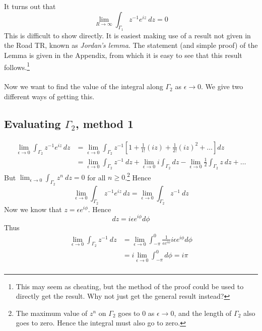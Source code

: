 It turns out that 
$$\lim_{R\to \infty}\int_{\Gamma_1} z^{-1}e^{iz}\ dz =0$$
This is difficult to show directly. It is easiest making use of a result not given in the Road TR, known as \emph{Jordan's lemma}. The statement (and simple proof) of the Lemma is given in the Appendix, from which it is easy to see that this result follows.\footnote{This may seem as cheating, but the method of the proof could be used to directly get the result. Why not just get the general result instead?} \\ \\
Now we want to find the value of the integral along $\Gamma_2$ as $\epsilon\to 0$. We give two different ways of getting this.
\subsection*{Evaluating $\Gamma_2$, method 1}
\begin{align*}
\lim_{\epsilon \to 0} \int_{\Gamma_2} z^{-1}e^{iz}\, dz&=\lim_{\epsilon \to 0} \int_{\Gamma_2} z^{-1}\left[ 1+\frac{1}{1!}(iz)+\frac{1}{2!}(iz)^2+\ldots\right ]dz\\
&=\lim_{\epsilon \to 0} \int_{\Gamma_2} z^{-1}\ dz+\lim_{\epsilon \to 0} i\int_{\Gamma_2} dz-\lim_{\epsilon \to 0} \frac{1}{2}\int_{\Gamma_2} z \ dz+\ldots
\end{align*} 
But $\lim_{\epsilon \to 0} \int_{\Gamma_2} z^{n}\ dz=0$
for all $n\geq 0$.\footnote{The maximum value of $z^n$ on $\Gamma_2$ goes to 0 as $\epsilon \to 0$, and the length of  $\Gamma_2$ also goes to zero. Hence the integral must also go to zero.} Hence 
$$ \lim_{\epsilon \to 0} \int_{\Gamma_2} z^{-1}e^{iz}\, dz=\lim_{\epsilon \to 0} \int_{\Gamma_2} z^{-1}\ dz$$
 Now we know that $z=\epsilon e^{i\phi}$. Hence 
$$d z=i \epsilon e^{i\phi}d\phi$$
Thus 
\begin{align*}
\lim_{\epsilon \to 0} \int_{\Gamma_2} z^{-1}\ dz&=\lim_{\epsilon \to 0} \int^{0}_{-\pi} \frac{1}{\epsilon e^{i\phi}}i \epsilon e^{i\phi}d\phi \\
&=i\lim_{\epsilon \to 0} \int^{0}_{-\pi} d\phi =i\pi \\
\end{align*}
